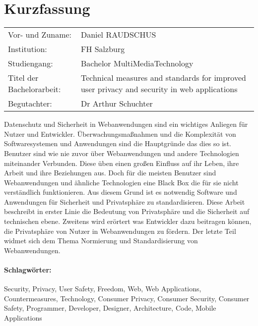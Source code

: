\section*{Kurzfassung}
\begin{tabular}{l l}
Vor- und Zuname:& Daniel RAUDSCHUS\\
Institution: & FH Salzburg\\ 
Studiengang: &  Bachelor MultiMediaTechnology\\ 
Titel der Bachelorarbeit: & Technical measures and standards for improved user privacy and security in web applications\\
Begutachter: & Dr Arthur Schuchter\\ 
\end{tabular} 
\vspace{0.5cm}

Datenschutz und Sicherheit in Webanwendungen sind ein wichtiges Anliegen für Nutzer und Entwickler. Überwachungsmaßnahmen und die Komplexität von Softwaresystemen und Anwendungen sind die Hauptgründe das dies so ist. Benutzer sind wie nie zuvor über Webanwendungen und andere Technologien miteinander Verbunden. Diese üben einen  großen Einfluss auf ihr Leben, ihre Arbeit und ihre Beziehungen aus. Doch für die meisten Benutzer sind Webanwendungen und ähnliche Technologien eine Black Box die für sie nicht verständlich funktionieren.  Aus diesem Grund ist es notwendig Software und Anwendungen für Sicherheit und Privatsphäre zu standardisieren. Diese Arbeit beschreibt in erster Linie die Bedeutung von Privatsphäre und die Sicherheit auf technischen ebene. Zweitens wird erörtert was Entwickler dazu beitragen können, die Privatsphäre von Nutzer in Webanwendungen zu fördern. Der letzte Teil widmet sich dem Thema Normierung und Standardisierung von Webanwendungen.
\paragraph{Schlagwörter:}
Security, Privacy, User Safety, Freedom, Web, Web Applications, Countermeasures, Technology, Consumer Privacy, Consumer Security, Consumer Safety, Programmer, Developer, Designer, Architecture, Code, Mobile Applications
